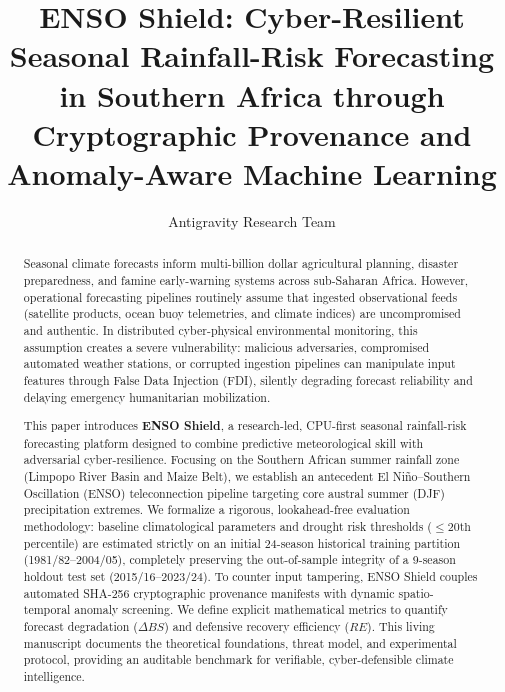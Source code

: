 \documentclass[runningheads]{llncs}
\begin{document}
\title{ENSO Shield: Cyber-Resilient Seasonal Rainfall-Risk Forecasting in Southern Africa through Cryptographic Provenance and Anomaly-Aware Machine Learning}

\author{Antigravity Research Team}


\maketitle

\begin{abstract}
Seasonal climate forecasts inform multi-billion dollar agricultural planning, disaster preparedness, and famine early-warning systems across sub-Saharan Africa. However, operational forecasting pipelines routinely assume that ingested observational feeds (satellite products, ocean buoy telemetries, and climate indices) are uncompromised and authentic. In distributed cyber-physical environmental monitoring, this assumption creates a severe vulnerability: malicious adversaries, compromised automated weather stations, or corrupted ingestion pipelines can manipulate input features through False Data Injection (FDI), silently degrading forecast reliability and delaying emergency humanitarian mobilization.

This paper introduces \textbf{ENSO Shield}, a research-led, CPU-first seasonal rainfall-risk forecasting platform designed to combine predictive meteorological skill with adversarial cyber-resilience. Focusing on the Southern African summer rainfall zone (Limpopo River Basin and Maize Belt), we establish an antecedent El Ni\~no--Southern Oscillation (ENSO) teleconnection pipeline targeting core austral summer (DJF) precipitation extremes. We formalize a rigorous, lookahead-free evaluation methodology: baseline climatological parameters and drought risk thresholds ($\le 20\text{th}$ percentile) are estimated strictly on an initial 24-season historical training partition (1981/82--2004/05), completely preserving the out-of-sample integrity of a 9-season holdout test set (2015/16--2023/24). To counter input tampering, ENSO Shield couples automated SHA-256 cryptographic provenance manifests with dynamic spatio-temporal anomaly screening. We define explicit mathematical metrics to quantify forecast degradation ($\Delta BS$) and defensive recovery efficiency ($RE$). This living manuscript documents the theoretical foundations, threat model, and experimental protocol, providing an auditable benchmark for verifiable, cyber-defensible climate intelligence.

\end{abstract}
\end{document}
